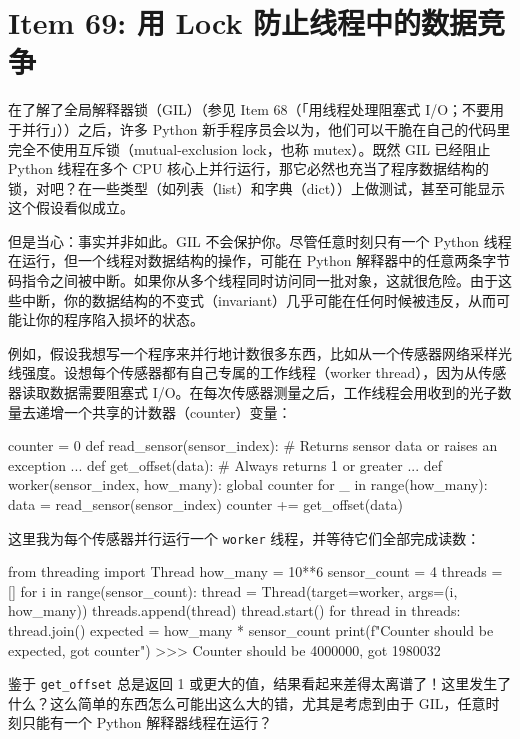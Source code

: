 \section{Item 69: 用 Lock 防止线程中的数据竞争}

在了解了全局解释器锁（GIL）（参见 Item 68（「用线程处理阻塞式 I/O；不要用于并行」））之后，许多 Python 新手程序员会以为，他们可以干脆在自己的代码里完全不使用互斥锁（mutual-exclusion lock，也称 mutex）。既然 GIL 已经阻止 Python 线程在多个 CPU 核心上并行运行，那它必然也充当了程序数据结构的锁，对吧？在一些类型（如列表（list）和字典（dict））上做测试，甚至可能显示这个假设看似成立。

但是当心：事实并非如此。GIL 不会保护你。尽管任意时刻只有一个 Python 线程在运行，但一个线程对数据结构的操作，可能在 Python 解释器中的任意两条字节码指令之间被中断。如果你从多个线程同时访问同一批对象，这就很危险。由于这些中断，你的数据结构的不变式（invariant）几乎可能在任何时候被违反，从而可能让你的程序陷入损坏的状态。

例如，假设我想写一个程序来并行地计数很多东西，比如从一个传感器网络采样光线强度。设想每个传感器都有自己专属的工作线程（worker thread），因为从传感器读取数据需要阻塞式 I/O。在每次传感器测量之后，工作线程会用收到的光子数量去递增一个共享的计数器（counter）变量：

\begin{codebox}[python]
counter = 0
def read_sensor(sensor_index):
    # Returns sensor data or raises an exception
    ...
def get_offset(data):
    # Always returns 1 or greater
    ...
def worker(sensor_index, how_many):
    global counter
    for _ in range(how_many):
        data = read_sensor(sensor_index)
        counter += get_offset(data)
\end{codebox}

这里我为每个传感器并行运行一个 \texttt{worker} 线程，并等待它们全部完成读数：

\begin{codebox}[python]
from threading import Thread
how_many = 10**6
sensor_count = 4
threads = []
for i in range(sensor_count):
    thread = Thread(target=worker, args=(i, how_many))
    threads.append(thread)
    thread.start()
for thread in threads:
    thread.join()
expected = how_many * sensor_count
print(f"Counter should be {expected}, got {counter}")
>>>
Counter should be 4000000, got 1980032
\end{codebox}

鉴于 \texttt{get\_offset} 总是返回 1 或更大的值，结果看起来差得太离谱了！这里发生了什么？这么简单的东西怎么可能出这么大的错，尤其是考虑到由于 GIL，任意时刻只能有一个 Python 解释器线程在运行？

